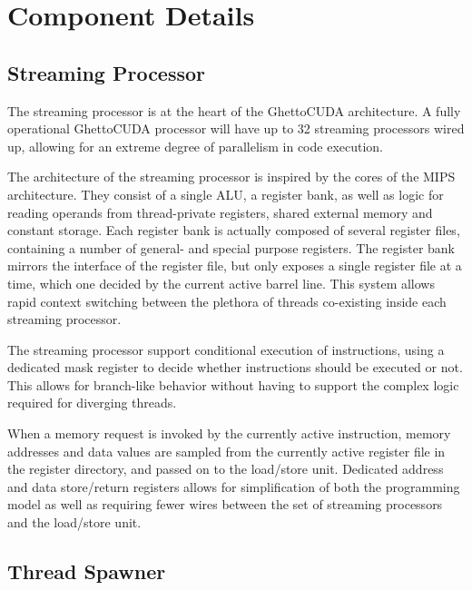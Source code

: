 \documentclass[../main/report.tex]{subfiles}
\begin{document}
\section{Component Details}


\subsection{Streaming Processor}

The streaming processor is at the heart of the GhettoCUDA architecture.
A fully operational GhettoCUDA processor will have up to 32 streaming processors wired up, allowing for an extreme degree of parallelism in code execution.

The architecture of the streaming processor is inspired by the cores of the MIPS architecture.
They consist of a single ALU, a register bank, as well as logic for reading operands from thread-private registers, shared external memory and constant storage.
Each register bank is actually composed of several register files, containing a number of general- and special purpose registers.
The register bank mirrors the interface of the register file, but only exposes a single register file at a time, which one decided by the current active barrel line.
This system allows rapid context switching between the plethora of threads co-existing inside each streaming processor.

The streaming processor support conditional execution of instructions, using a dedicated mask register to decide whether instructions should be executed or not.
This allows for branch-like behavior without having to support the complex logic required for diverging threads.

When a memory request is invoked by the currently active instruction, memory addresses and data values are sampled from the currently active register file in the register directory, and passed on to the load/store unit.
Dedicated address and data store/return registers allows for simplification of both the programming model as well as requiring fewer wires between the set of streaming processors and the load/store unit.

\subsection{Thread Spawner}
\end{document}
